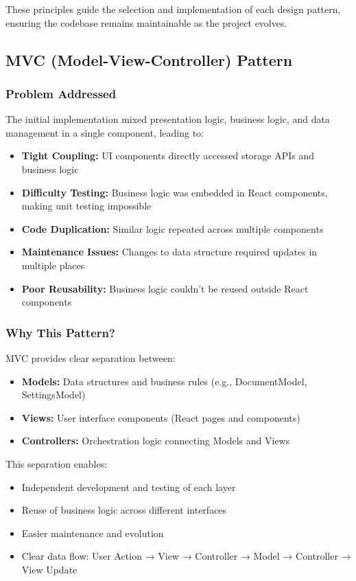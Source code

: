 \documentclass[11pt, a4paper]{article}
\theoremstyle{plain}
\theoremstyle{definition}
\begin{document}
These principles guide the selection and implementation of each design pattern, ensuring the codebase remains maintainable as the project evolves.

\subsection{MVC (Model-View-Controller) Pattern}

\subsubsection{Problem Addressed}

The initial implementation mixed presentation logic, business logic, and data management in a single component, leading to:
    \begin{itemize}
    \item \textbf{Tight Coupling:} UI components directly accessed storage APIs and business logic
    \item \textbf{Difficulty Testing:} Business logic was embedded in React components, making unit testing impossible
    \item \textbf{Code Duplication:} Similar logic repeated across multiple components
    \item \textbf{Maintenance Issues:} Changes to data structure required updates in multiple places
    \item \textbf{Poor Reusability:} Business logic couldn't be reused outside React components
    \end{itemize}

\subsubsection{Why This Pattern?}

MVC provides clear separation between:
\begin{itemize}
    \item \textbf{Models:} Data structures and business rules (e.g., DocumentModel, SettingsModel)
    \item \textbf{Views:} User interface components (React pages and components)
    \item \textbf{Controllers:} Orchestration logic connecting Models and Views
\end{itemize}

This separation enables:
    \begin{itemize}
    \item Independent development and testing of each layer
    \item Reuse of business logic across different interfaces
    \item Easier maintenance and evolution
    \item Clear data flow: User Action → View → Controller → Model → Controller → View Update
    \end{itemize}
\end{document}
